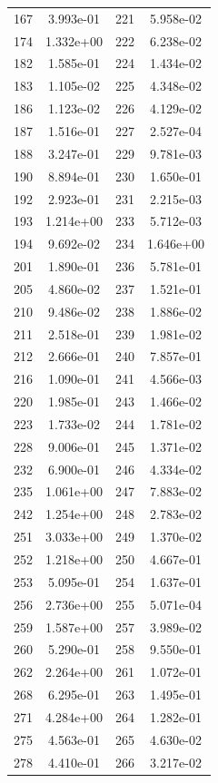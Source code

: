 \documentclass[12pt]{article}
\begin{document}
\begin{longtable}{@{}cccc@{}}
167 & 3.993e-01 & 221 & 5.958e-02 \\
174 & 1.332e+00 & 222 & 6.238e-02 \\
182 & 1.585e-01 & 224 & 1.434e-02 \\
183 & 1.105e-02 & 225 & 4.348e-02 \\
186 & 1.123e-02 & 226 & 4.129e-02 \\
187 & 1.516e-01 & 227 & 2.527e-04 \\
188 & 3.247e-01 & 229 & 9.781e-03 \\
190 & 8.894e-01 & 230 & 1.650e-01 \\
192 & 2.923e-01 & 231 & 2.215e-03 \\
193 & 1.214e+00 & 233 & 5.712e-03 \\
194 & 9.692e-02 & 234 & 1.646e+00 \\
201 & 1.890e-01 & 236 & 5.781e-01 \\
205 & 4.860e-02 & 237 & 1.521e-01 \\
210 & 9.486e-02 & 238 & 1.886e-02 \\
211 & 2.518e-01 & 239 & 1.981e-02 \\
212 & 2.666e-01 & 240 & 7.857e-01 \\
216 & 1.090e-01 & 241 & 4.566e-03 \\
220 & 1.985e-01 & 243 & 1.466e-02 \\
223 & 1.733e-02 & 244 & 1.781e-02 \\
228 & 9.006e-01 & 245 & 1.371e-02 \\
232 & 6.900e-01 & 246 & 4.334e-02 \\
235 & 1.061e+00 & 247 & 7.883e-02 \\
242 & 1.254e+00 & 248 & 2.783e-02 \\
251 & 3.033e+00 & 249 & 1.370e-02 \\
252 & 1.218e+00 & 250 & 4.667e-01 \\
253 & 5.095e-01 & 254 & 1.637e-01 \\
256 & 2.736e+00 & 255 & 5.071e-04 \\
259 & 1.587e+00 & 257 & 3.989e-02 \\
260 & 5.290e-01 & 258 & 9.550e-01 \\
262 & 2.264e+00 & 261 & 1.072e-01 \\
268 & 6.295e-01 & 263 & 1.495e-01 \\
271 & 4.284e+00 & 264 & 1.282e-01 \\
275 & 4.563e-01 & 265 & 4.630e-02 \\
278 & 4.410e-01 & 266 & 3.217e-02 \\

\end{longtable}
\end{document}
